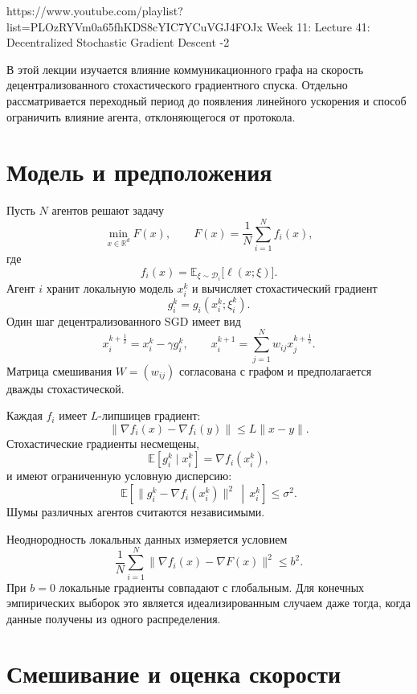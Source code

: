 
\sourcevideo
    {https://www.youtube.com/playlist?list=PLOzRYVm0a65fhKDS8cYIC7YCuVGJ4FOJx}
    {Week 11: Lecture 41: Decentralized Stochastic Gradient Descent -2}

В этой лекции изучается влияние коммуникационного графа на скорость
децентрализованного стохастического градиентного спуска. Отдельно
рассматривается переходный период до появления линейного ускорения и
способ ограничить влияние агента, отклоняющегося от протокола.

\section{Модель и предположения}

Пусть \(N\) агентов решают задачу
\[
    \min_{x\in\mathbb R^d}F(x),
    \qquad
    F(x)=\frac1N\sum_{i=1}^{N}f_i(x),
\]
где
\[
    f_i(x)
    =
    \mathbb E_{\xi\sim\mathcal D_i}
    \bigl[\ell(x;\xi)\bigr].
\]
Агент \(i\) хранит локальную модель \(x_i^k\) и вычисляет
стохастический градиент
\[
    g_i^k=g_i(x_i^k;\xi_i^k).
\]
Один шаг децентрализованного SGD имеет вид
\[
    x_i^{k+\frac12}
    =
    x_i^k-\gamma g_i^k,
    \qquad
    x_i^{k+1}
    =
    \sum_{j=1}^{N}w_{ij}x_j^{k+\frac12}.
\]
Матрица смешивания \(W=(w_{ij})\) согласована с графом и предполагается
дважды стохастической.

Каждая \(f_i\) имеет \(L\)-липшицев градиент:
\[
    \lVert\nabla f_i(x)-\nabla f_i(y)\rVert
    \le
    L\lVert x-y\rVert.
\]
Стохастические градиенты несмещены,
\[
    \mathbb E[g_i^k\mid x_i^k]
    =
    \nabla f_i(x_i^k),
\]
и имеют ограниченную условную дисперсию:
\[
    \mathbb E
    \left[
        \lVert
            g_i^k-\nabla f_i(x_i^k)
        \rVert^2
        \,\middle|\,
        x_i^k
    \right]
    \le
    \sigma^2.
\]
Шумы различных агентов считаются независимыми.

Неоднородность локальных данных измеряется условием
\[
    \frac1N
    \sum_{i=1}^{N}
    \lVert
        \nabla f_i(x)-\nabla F(x)
    \rVert^2
    \le
    b^2.
\]
При \(b=0\) локальные градиенты совпадают с глобальным. Для конечных
эмпирических выборок это является идеализированным случаем даже тогда,
когда данные получены из одного распределения.

\section{Смешивание и оценка скорости}

